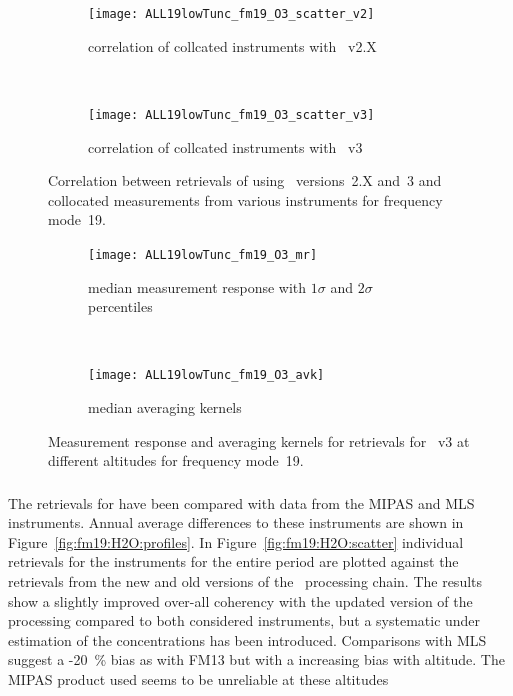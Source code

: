 \begin{figure}[tbhp]
    \centering
    \begin{subfigure}[b]{0.49\textwidth}
        \texttt{[image: ALL19lowTunc\_fm19\_O3\_scatter\_v2]}
        \caption{correlation of collcated instruments with \smr~v2.X}
        \label{fig:fm19:O3:scatter:v2}
    \end{subfigure}
    \,
    \begin{subfigure}[b]{0.49\textwidth}
        \texttt{[image: ALL19lowTunc\_fm19\_O3\_scatter\_v3]}
        \caption{correlation of collcated instruments with \smr~v3}
        \label{fig:fm19:O3:scatter:v3}
    \end{subfigure}
    \caption{Correlation between retrievals of  using \smr\
    versions~2.X and~3 and collocated measurements from various instruments
    for frequency mode~19.}
    \label{fig:fm19:O3:scatter}
\end{figure}

\begin{figure}[tbhp]
    \centering
    \begin{subfigure}[b]{0.49\textwidth}
        \texttt{[image: ALL19lowTunc\_fm19\_O3\_mr]}
        \caption{median measurement response with $1\sigma$ and $2\sigma$
        percentiles}
        \label{fig:fm19:O3:mr}
    \end{subfigure}
    \,
    \begin{subfigure}[b]{0.49\textwidth}
        \texttt{[image: ALL19lowTunc\_fm19\_O3\_avk]}
        \caption{median averaging kernels\newline~}
        \label{fig:fm19:O3:avk}
    \end{subfigure}
    \caption{Measurement response and averaging kernels for 
    retrievals for \smr~v3 at different altitudes for frequency mode~19.}
    \label{fig:fm19:O3:mr_avk}
\end{figure}



\subsubsection{}
\label{sec:fm19:comparison:H2O}
The retrievals for \chem{H_2O} have been compared with data from the MIPAS and
MLS instruments.  Annual average differences to these instruments are shown in
Figure~\ref{fig:fm19:H2O:profiles}. In Figure~\ref{fig:fm19:H2O:scatter}
individual retrievals for the instruments for the entire period are plotted
against the retrievals from the new and old versions of the \smr\ processing
chain. The results show a slightly improved over-all coherency with the
updated version of the processing compared to both considered instruments, but
a systematic under estimation of the concentrations has been introduced.
Comparisons with MLS suggest a -20~\% bias as with FM13 but with a increasing
bias with altitude.  The MIPAS product used seems to be unreliable at these
altitudes

